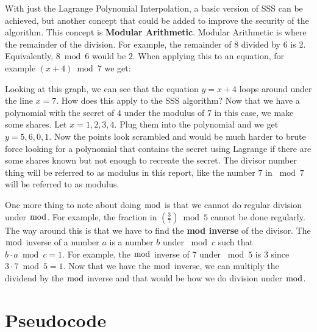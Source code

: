 \documentclass[15pt]{article}
\begin{document}
\begin{flushleft}
With just the Lagrange Polynomial Interpolation, a basic version of SSS can be
achieved, but another concept that could be added to improve the security of the
algorithm. This concept is \textbf{Modular Arithmetic}. Modular Arithmetic is
where the remainder of the division. For example, the remainder of 8 divided by
6 is 2. Equivalently, $8 \bmod 6$ would be $2$. When applying this to an
equation, for example $(x+4) \bmod 7$ we get:
\begin{center}
\end{center}
Looking at this graph, we can see that the equation $y=x+4$ loops around under
the line $x=7$. How does this apply to the SSS algorithm? Now that we have a
polynomial with the secret of $4$ under the modulus of $7$ in this case, we
make some shares. Let $x=1,2,3,4$. Plug them into the polynomial and we get
$y=5,6,0,1$. Now the points look scrambled and would be much harder to brute
force looking for a polynomial that contains the secret using Lagrange if there
are some shares known but not enough to recreate the secret. The divisor number
thing will be referred to as modulus in this report, like the number $7$ in
$\bmod 7$ will be referred to as modulus.

One more thing to note about doing $\bmod$ is that we cannot do regular division
under $\bmod$. For example, the fraction in $(\frac{3}{7}) \bmod 5$ cannot be
done regularly. The way around this is that we have to find the \textbf{mod
inverse} of the divisor. The $\bmod$ inverse of a number $a$ is a number $b$
under $\bmod c$ such that $b \cdot a \bmod c = 1$. For example, the $\bmod$
inverse of $7$ under $\bmod 5$ is $3$ since $3 \cdot 7 \bmod 5 = 1$. Now that we
have the $\bmod$ inverse, we can multiply the dividend by the $\bmod$ inverse
and that would be how we do division under $\bmod$. 

\section{\textbf{Pseudocode}}


\end{flushleft}
\end{document}

